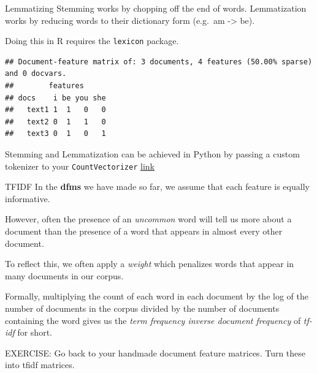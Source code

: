 \documentclass[
  10pt,
  ignorenonframetext,
  aspectratio=169]{beamer}
\newenvironment{Shaded}{\begin{snugshade}}{\end{snugshade}}
\newcommand{\AttributeTok}[1]{\textcolor[rgb]{0.80,0.80,0.80}{#1}}
\newcommand{\FunctionTok}[1]{\textcolor[rgb]{0.94,0.94,0.56}{#1}}
\newcommand{\NormalTok}[1]{\textcolor[rgb]{0.80,0.80,0.80}{#1}}
\newcommand{\OtherTok}[1]{\textcolor[rgb]{0.94,0.94,0.56}{#1}}
\newcommand{\SpecialCharTok}[1]{\textcolor[rgb]{0.86,0.64,0.64}{#1}}
\newcommand{\StringTok}[1]{\textcolor[rgb]{0.80,0.58,0.58}{#1}}
\begin{document}
\begin{frame}[fragile]{Lemmatizing}
\protect\hypertarget{lemmatizing}{}
Stemming works by chopping off the end of words. Lemmatization works by
reducing words to their dictionary form (e.g.~am -\textgreater{} be).

Doing this in R requires the \texttt{lexicon} package.

\smallskip

\scriptsize

\begin{Shaded}
\end{Shaded}

\begin{verbatim}
## Document-feature matrix of: 3 documents, 4 features (50.00% sparse) and 0 docvars.
##        features
## docs    i be you she
##   text1 1  1   0   0
##   text2 0  1   1   0
##   text3 0  1   0   1
\end{verbatim}

\normalsize

Stemming and Lemmatization can be achieved in Python by passing a custom
tokenizer to your \texttt{CountVectorizer}
\href{https://scikit-learn.org/stable/modules/feature_extraction.html\#customizing-the-vectorizer-classes}{link}
\end{frame}

\begin{frame}{TFIDF}
\protect\hypertarget{tfidf}{}
In the \textbf{dfms} we have made so far, we assume that each feature is
equally informative.

However, often the presence of an \emph{uncommon} word will tell us more
about a document than the presence of a word that appears in almost
every other document.

To reflect this, we often apply a \emph{weight} which penalizes words
that appear in many documents in our corpus.

Formally, multiplying the count of each word in each document by the log
of the number of documents in the corpus divided by the number of
documents containing the word gives us the \emph{term frequency inverse
document frequency} of \emph{tf-idf} for short.

EXERCISE: Go back to your handmade document feature matrices. Turn these
into tfidf matrices.
\end{frame}
\end{document}
